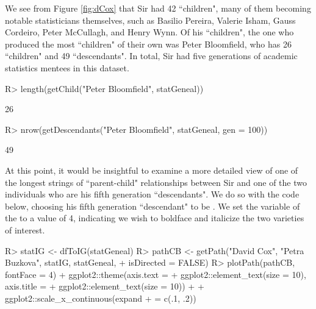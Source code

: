 \documentclass[article,shortnames]{jss}
\begin{document}
We see from Figure \ref{fig:dCox} that Sir  had 42 ``children", many of them becoming notable statisticians themselves, such as Basilio Pereira, Valerie Isham, Gauss Cordeiro, Peter McCullagh, and Henry Wynn. Of his ``children", the one who produced the most ``children" of their own was Peter Bloomfield, who has 26 ``children" and 49 ``descendants". In total, Sir  had five generations of academic statistics mentees in this dataset.

\begin{CodeChunk}
\begin{CodeInput}
R> length(getChild("Peter Bloomfield", statGeneal))
\end{CodeInput}
\begin{CodeOutput}
[1] 26
\end{CodeOutput}
\begin{CodeInput}
R> nrow(getDescendants("Peter Bloomfield", statGeneal, gen = 100))
\end{CodeInput}
\begin{CodeOutput}
[1] 49
\end{CodeOutput}
\end{CodeChunk}

At this point, it would be insightful to examine a more detailed view of one of the longest strings of ``parent-child" relationships between Sir  and one of the two individuals who are his fifth generation ``descendants". We do so with the code below, choosing his fifth generation ``descendant" to be . We set the  variable of the  to a value of 4, indicating we wish to boldface and italicize the two varieties of interest.

\begin{CodeChunk}
\begin{CodeInput}
R> statIG <- dfToIG(statGeneal)
R> pathCB <- getPath("David Cox", "Petra Buzkova", statIG, statGeneal,
+    isDirected = FALSE)
R> plotPath(pathCB, fontFace = 4) + ggplot2::theme(axis.text =
+    ggplot2::element_text(size = 10), axis.title =
+    ggplot2::element_text(size = 10)) + + ggplot2::scale_x_continuous(expand
+    = c(.1, .2))
\end{CodeInput}
\end{CodeChunk}
\end{document}
